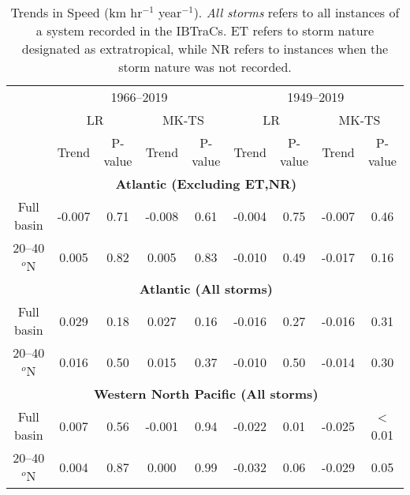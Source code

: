 \documentclass[wcd,manuscript]{copernicus}
\begin{document}
\begin{table*}[t]
  \caption{Trends in Speed (km hr$^{-1}$ year$^{-1}$). \emph{All storms} refers to all instances of a
    system recorded in the IBTraCs. ET refers to storm nature designated as extratropical, while NR refers to instances
    when the storm nature was not recorded. }

\begin{tabular}{|c|cccc|cccc|}
\hline
& \multicolumn{4}{|c|}{1966--2019}& \multicolumn{4}{|c|}{1949--2019}\\
& \multicolumn{2}{c}{LR} & \multicolumn{2}{c|}{MK-TS}& \multicolumn{2}{c}{LR} & \multicolumn{2}{c|}{MK-TS}\\
& Trend & P-value & Trend & P-value & Trend & P-value & Trend & P-value\\
\hline
&  \multicolumn{7}{c}{\bf{Atlantic (Excluding ET,NR)}}  &   \\
 Full basin    & -0.007 & 0.71 & -0.008 & 0.61 & -0.004 & 0.75 & -0.007 & 0.46\\
 20--40$^o$N         &  0.005 & 0.82 &  0.005 & 0.83 & -0.010 & 0.49 & -0.017 & 0.16\\
\hline
\hline


&  \multicolumn{7}{c}{\bf{Atlantic (All storms)}}  &   \\

Full basin    & 0.029 & 0.18 &  0.027 & 0.16  & -0.016 & 0.27 & -0.016 & 0.31\\
20--40$^o$N        & 0.016 & 0.50 &  0.015 & 0.37  & -0.010 & 0.50 & -0.014 & 0.30\\

\hline
&  \multicolumn{7}{c}{\bf{Western North Pacific (All storms)}}  &   \\
Full basin    &  0.007 & 0.56 & -0.001 & 0.94 & -0.022 & 0.01 & -0.025 & < 0.01\\
20--40$^o$N        &  0.004 & 0.87 &  0.000 & 0.99 & -0.032 & 0.06 & -0.029 & 0.05\\
\hline
\end{tabular}
\label{tab:atl_sp}
\end{table*}

\end{document}
